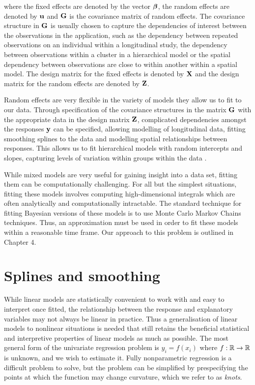 \noindent 
where the fixed effects are denoted by the vector ${\boldsymbol \beta}$, the random effects
are denoted by ${\bf u}$ and ${\bf G}$ is the covariance matrix of random effects. The
covariance structure in ${\bf G}$ is usually chosen to capture the dependencies of
interest between the observations in the application, such as the dependency
between repeated observations on an individual within a longitudinal study, the
dependency between observations within a cluster in a hierarchical model or the
spatial dependency between observations are close to within another within a
spatial model. The design matrix for the fixed effects is denoted by ${\bf X}$ and
the design matrix for the random effects are denoted by ${\bf Z}$.

Random effects are very flexible in the variety of models they allow us to fit
to our data. Through specification of the covariance structures in the matrix
${\bf G}$ with the appropriate data in the design matrix ${\bf Z}$, complicated
dependencies amongst the responses ${\bf y}$ can be specified, allowing modelling of
longitudinal data, fitting smoothing splines to the data and modelling spatial
relationships between responses. This allows us to fit hierarchical models with
random intercepts and slopes, capturing levels of variation within groups within
the data \citep{Gelman2007}.

While mixed models are very useful for gaining insight into a data set, fitting
them can be computationally challenging. For all but the simplest situations,
fitting these models involves computing high-dimensional integrals which are
often analytically and computationally intractable. The standard technique for
fitting Bayesian versions of these models is to use Monte Carlo Markov Chains
techniques. Thus, an approximation must be used in order to fit these models
within a reasonable time frame. Our approach to this problem is outlined in
Chapter 4.

\section{Splines and smoothing}

While linear models are statistically convenient to work with and easy to
interpret once fitted, the relationship between the response and explanatory
variables may not always be linear in practice. Thus a generalisation of linear
models to nonlinear situations is needed that still retains the beneficial
statistical and interpretive properties of linear models as much as possible.
The most general form of the univariate regression problem is
$ y_i = f(x_i) $
where $f: {\mathbb{R}} \to {\mathbb{R}}$ is unknown, and we wish to estimate it.  Fully
nonparametric regression is a difficult problem to solve, but the problem can
be simplified by prespecifying the points at which the function may change
curvature, which we refer to as \emph{knots}.

